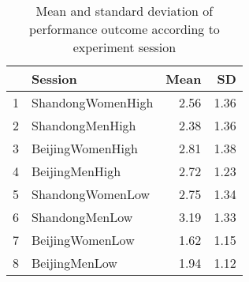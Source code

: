 \begin{table}[ht]
\centering
\begin{tabular}{rlrr}
  \hline
 & Session & Mean & SD \\ 
  \hline
1 & ShandongWomenHigh & 2.56 & 1.36 \\ 
  2 & ShandongMenHigh & 2.38 & 1.36 \\ 
  3 & BeijingWomenHigh & 2.81 & 1.38 \\ 
  4 & BeijingMenHigh & 2.72 & 1.23 \\ 
  5 & ShandongWomenLow & 2.75 & 1.34 \\ 
  6 & ShandongMenLow & 3.19 & 1.33 \\ 
  7 & BeijingWomenLow & 1.62 & 1.15 \\ 
  8 & BeijingMenLow & 1.94 & 1.12 \\ 
   \hline
\end{tabular}
\caption{Mean and standard deviation of performance outcome according to experiment session} 
\label{tab:outcomeAvgSdSession}
\end{table}
